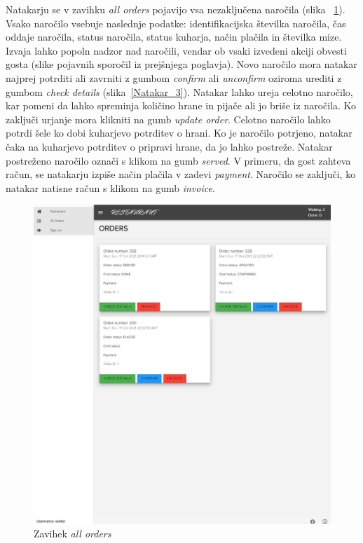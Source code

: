 \documentclass[a4paper, 12pt]{book}
\begin{document}
Natakarju se v zavihku \textit{all orders} pojavijo vsa nezaključena naročila (slika ~\ref{Natakar_2}). Vsako naročilo vsebuje naslednje podatke: identifikacijska številka naročila, čas oddaje naročila, status naročila, status kuharja, način plačila in številka mize. Izvaja lahko popoln nadzor nad naročili, vendar ob vsaki izvedeni akciji obvesti gosta (slike pojavnih sporočil iz prejšnjega poglavja). Novo naročilo mora natakar najprej potrditi ali zavrniti z gumbom \textit{confirm} ali \textit{unconfirm} oziroma urediti z gumbom \textit{check details} (slika~\ref{Natakar_3}). Natakar lahko ureja celotno naročilo, kar pomeni da lahko spreminja količino hrane in pijače ali jo briše iz naročila. Ko zaključi urjanje mora klikniti na gumb \textit{update order}. Celotno naročilo lahko potrdi šele ko dobi kuharjevo potrditev o hrani. Ko je naročilo potrjeno, natakar čaka na kuharjevo potrditev o pripravi hrane, da jo lahko postreže. Natakar postreženo naročilo označi s klikom na gumb \textit{served}. V primeru, da gost zahteva račun, se natakarju izpiše način plačila v zadevi \textit{payment}. Naročilo se zaključi, ko natakar natisne račun s klikom na gumb \textit{invoice}.

\begin{figure}[!htb]
\begin{center}
\includegraphics[width=12cm]{natakar_21.jpg}
\caption{Zavihek \textit{all orders}}
\label{Natakar_2}
\end{center}
\end{figure}
\end{document}
